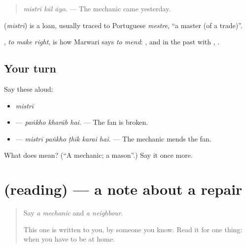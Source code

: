 \begin{quote}
\emph{mistrī kāl āyo.} — The mechanic came yesterday.
\end{quote}

\begin{cousinweb}
\textbf{} (\emph{mistrī}) is a loan, usually traced to Portuguese \emph{mestre}, \textquotedblleft{}a master (of a trade)\textquotedblright{}.
\end{cousinweb}

\begin{grammarlens}[title={What you've built}]
\textbf{ }, \emph{to make right}, is how Marwari says \emph{to mend}: \textbf{  }, and in the past with \textbf{}, \textbf{ }.
\end{grammarlens}

\subsection*{Your turn}
Say these aloud:

\begin{itemize}
\raggedright
  \item \emph{mistrī}
  \item \textbf{  } — \emph{paṅkho kharāb hai.} — The fan is broken.
  \item \textbf{    } — \emph{mistrī paṅkho ṭhīk karai hai.} — The mechanic mends the fan.
\end{itemize}

\begin{tcolorbox}[breakable,colback=teal!4,colframe=teal!35!black,title={Before you move on}]
What does \textbf{} mean? (\textquotedblleft{}A mechanic; a mason\textquotedblright{}.) Say it once more.
\end{tcolorbox}
\section[(reading)]{(reading) — a note about a repair}

\label{lesson:MW-C165-repair-note}



\begin{quote}
Say \emph{a mechanic} and \emph{a neighbour}.

This one is written to you, by someone you know. Read it for one thing: when you have to be at home.
\end{quote}

